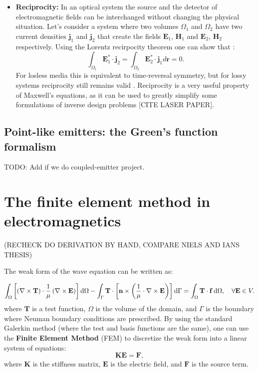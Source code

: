 \begin{itemize}
    \item \textbf{Reciprocity:} In an optical system the source and the detector of electromagnetic fields can be interchanged without changing the physical situation. Let's consider a system where two volumes $\Omega_1$ and $\Omega_2$ 
    have two current densities $\mathbf{j}_1$ and $\mathbf{j}_2$ that create the fields $\mathbf{E}_1$, $\mathbf{H}_1$ and $\mathbf{E}_2$, $\mathbf{H}_2$ respectively. Using the Lorentz recirpocity theorem one can show that \cite{novotny}:      
    \begin{equation}
        \int_{\Omega_1} \mathbf{E}_1^* \cdot \mathbf{j}_2 = \int_{\Omega_2}  \mathbf{E}_2^* \cdot \mathbf{j}_1 d\mathbf{r} = 0.
    \end{equation}
    For losless media this is equivalent to time-reversal symmetry, but for lossy systems reciprocity still remains valid \cite{Carminati:98}. Reciprocity is a very useful property of Maxwell's equations, as it can be used to 
    greatly simplify some formulations of inverse design problems [CITE LASER PAPER].


\end{itemize}

\subsection*{Point-like emitters: the Green's function formalism}

TODO: Add if we do coupled-emitter project.

\section{The finite element method in electromagnetics}

(RECHECK DO DERIVATION BY HAND, COMPARE NIELS AND IANS THESIS)

The weak form of the wave equation can be written as:

    \begin{equation}
        \int_\Omega \left[ \left( \nabla \times \mathbf{T} \right) \cdot \frac{1}{\mu} \left( \nabla \times \mathbf{E} \right) \right] \mathop{}\!\text{d} \Omega 
        - \int_\Gamma \mathbf{T} \cdot \left[ \mathbf{n} \times \left( \frac{1}{\mu} \cdot \nabla \times \mathbf{E} \right) \right] \mathop{}\!\text{d} \Gamma \\
        = \int_\Omega \mathbf{T} \cdot \mathbf{f} \mathop{}\!\text{d} \Omega,
        \quad \forall \mathbf{E} \in V.
    \end{equation}
where $\mathbf{T}$ is a test function, $\Omega$ is the volume of the domain, and $\Gamma$ is the boundary where Neuman boundary conditions
are prescribed. By using  the standard Galerkin method (where the test and basis functions are the same), one can use the \textbf{Finite Element Method} 
(FEM) to discretize the weak form 
into a linear system of equations:
\begin{equation}
    \mathbf{K} \mathbf{E} = \mathbf{F},
\end{equation}
where $\mathbf{K}$ is the stiffness matrix, $\mathbf{E}$ is the electric field, and $\mathbf{F}$ is the source term.

